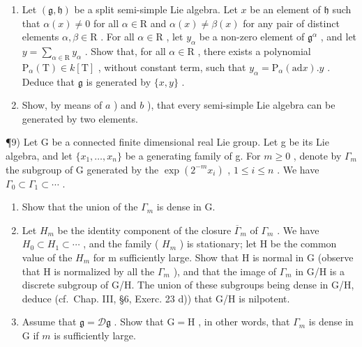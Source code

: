 \begin{enumerate}
\def\labelenumi{\alph{enumi})}
\setcounter{enumi}{1}
\item
  Let \((\mathfrak{g},\mathfrak{h})\) be a split semi-simple Lie algebra. Let \(x\) be an element of \(\mathfrak{h}\) such that \(\alpha (x)\neq 0\) for all \(\alpha \in \mathrm{R}\) and \(\alpha (x)\neq \beta (x)\) for any pair of distinct elements \(\alpha ,\beta \in \mathrm{R}\) . For all \(\alpha \in \mathrm{R}\) , let \(y_{\alpha}\) be a non-zero element of \(\mathfrak{g}^{\alpha}\) , and let \(y = \sum_{\alpha \in \mathrm{R}}y_{\alpha}\) . Show that, for all \(\alpha \in \mathrm{R}\) , there exists a polynomial \(\mathrm{P}_{\alpha}(\mathrm{T})\in k[\mathrm{T}]\) , without constant term, such that \(y_{\alpha} = \mathrm{P}_{\alpha}(\mathrm{ad}x).y\) . Deduce that \(\mathfrak{g}\) is generated by \(\{x,y\}\) .
\item
  Show, by means of \(a\) ) and \(b\) ), that every semi-simple Lie algebra can be generated by two elements.
\end{enumerate}

¶9) Let G be a connected finite dimensional real Lie group. Let g be its Lie algebra, and let \(\{x_{1},\ldots,x_{n}\}\) be a generating family of g. For \(m\geq0\) , denote by \(\Gamma_{m}\) the subgroup of G generated by the \(\exp(2^{-m}x_{i})\) , \(1\leq i\leq n\) . We have \(\Gamma_{0}\subset\Gamma_{1}\subset\cdots\) .

\begin{enumerate}
\def\labelenumi{\alph{enumi})}
\item
  Show that the union of the \(\Gamma_{m}\) is dense in G.
\item
  Let \(H_{m}\) be the identity component of the closure \(\overline{\Gamma}_{m}\) of \(\Gamma_{m}\) . We have \(H_{0} \subset H_{1} \subset \cdots\) , and the family ( \(H_{m}\) ) is stationary; let H be the common value of the \(H_{m}\) for m sufficiently large. Show that H is normal in G (observe that H is normalized by all the \(\Gamma_{m}\) ), and that the image of \(\Gamma_{m}\) in G/H is a discrete subgroup of G/H. The union of these subgroups being dense in G/H, deduce (cf.~Chap. III, §6, Exerc. 23 d)) that G/H is nilpotent.
\item
  Assume that \(\mathfrak{g} = \mathcal{D}\mathfrak{g}\) . Show that \(\mathrm{G} = \mathrm{H}\) , in other words, that \(\Gamma_{m}\) is dense in \(\mathrm{G}\) if \(m\) is sufficiently large.
\end{enumerate}

